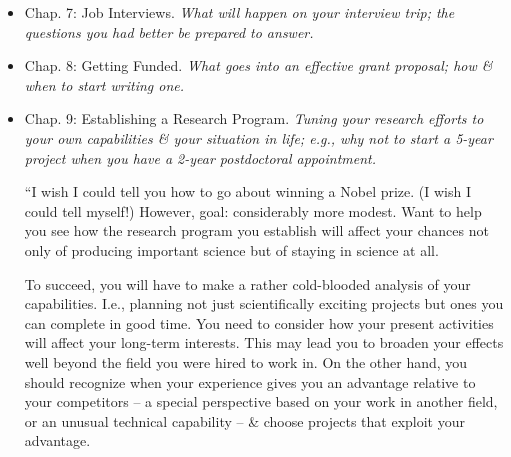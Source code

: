 \documentclass{article}
\begin{document}
\begin{enumerate}
\begin{itemize}
\begin{itemize}
			Financial priorities thus dictate the same career path as the scientific ones. Entry-level salaries are better in the research labs, \& the merit pay increases they provide can keep you earning more than your university colleagues until you reach the somewhat poorly defined level of ``senior scientists.'' After that, if you want to maximize your salary in industry or in a government lab, there is no alternative but to move into a management position. (1 thing managers seem to do very well is reward themselves.) If you want a high salary while keeping a hand in research, the best alternative is a full professorship. Having established an outstanding scientific reputation working 8 hours a day at a commercial or government lab, you will know what a good contract proposal looks like; you will be relatively successful at bringing in money; \& so you will have a good salary, many students \& postdocs, \& all the good things a university has to offer.

			Circumstances -- economic, family, or other -- may prevent you from following the optimal career trajectory. But at least I hope you will now go into the job market with a clear idea of how you would like to arrange your career \& why.
			\item {\sf Additional Reading.} Browse \url{sciencecareers.sciencemag.org}, the careers website of Science magazine.
		\end{itemize}

		\item {\sf Chap. 7: Job Interviews.} {\it What will happen on your interview trip; the questions you had better be prepared to answer.}

		\item {\sf Chap. 8: Getting Funded.} {\it What goes into an effective grant proposal; how \& when to start writing one.}

		\item {\sf Chap. 9: Establishing a Research Program.} {\it Tuning your research efforts to your own capabilities \& your situation in life; e.g., why not to start a 5-year project when you have a 2-year postdoctoral appointment.}

		``I wish I could tell you how to go about winning a Nobel prize. (I wish I could tell myself!) However, goal: considerably more modest. Want to help you see how the research program you establish will affect your chances not only of producing important science but of staying in science at all.

		To succeed, you will have to make a rather cold-blooded analysis of your capabilities. I.e., planning not just scientifically exciting projects but ones you can complete in good time. You need to consider how your present activities will affect your long-term interests. This may lead you to broaden your effects well beyond the field you were hired to work in. On the other hand, you should recognize when your experience gives you an advantage relative to your competitors -- a special perspective based on your work in another field, or an unusual technical capability -- \& choose projects that exploit your advantage.


\end{itemize}
\end{enumerate}
\end{document}
